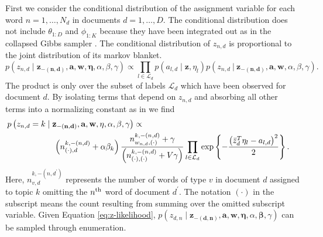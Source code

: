 First we consider the conditional distribution of the assignment variable
for each word $n=1,\ldots,N_{d}$ in documents $d=1,\ldots,D$. The
conditional distribution does not include $\theta_{1:D}$ and $\phi_{1:K}$
because they have been integrated out as in the collapsed Gibbs sampler
\citep{Griffiths04}. The conditional distribution of $z_{n,d}$ is
proportional to the joint distribution of its markov blanket. %
\begin{equation}
p\left(z_{n,d}\mid\mathbf{z_{-\left(n,d\right)}},\mathbf{a},\mathbf{w},\mathbf{\eta},\alpha,\beta,\gamma\right)\propto\prod_{l\in\mathcal{L}_{d}}p\left(a_{l,d}\mid\mathbf{z},\eta_{l}\right)p\left(z_{n,d}\ |\ \mathbf{z_{-\left(n,d\right)}},\mathbf{a},\mathbf{w},\alpha,\beta,\gamma\right).\end{equation}
 The product is only over the subset of labels $\mathcal{L}_{d}$
which have been observed for document $d$. By isolating terms that
depend on $z_{n,d}$ and absorbing all other terms into a normalizing
constant as in \citep{Griffiths04} we find \begin{eqnarray}
\lefteqn{p\left(z_{n,d}=k\mid\mathbf{z_{-\left(n,d\right)}},\mathbf{a},\mathbf{w},\mathbf{\eta},\alpha,\beta,\gamma\right)\propto}\nonumber \\
 & \hspace{2cm}\left(n_{\left(\cdot\right),d}^{k,-\left(n,d\right)}+\alpha\beta_{k}\right)\frac{n_{w_{n,d},\left(\cdot\right)}^{k,-\left(n,d\right)}+\gamma}{\left(n_{\left(\cdot\right),\left(\cdot\right)}^{k,-\left(n,d\right)}+V\gamma\right)}\prod_{l\in\mathcal{L}_{d}}\exp\left\{ -\frac{\left(\bar{z}_{d}^{T}\eta_{l}-a_{l,d}\right)^{2}}{2}\right\} .\label{eq:z-likelihood}\end{eqnarray}
 Here, $n_{v,d}^{k,-\left(n,d^{\prime}\right)}$ represents the number
of words of type $v$ in document $d$ assigned to topic $k$ omitting
the $n^{{\rm th}}$ word of document $d^{\prime}$. The notation $(\cdot)$
in the subscript means the count resulting from summing over the omitted
subscript variable. Given Equation \ref{eq:z-likelihood}, $p\left(z_{d,n}\mid\mathbf{z_{-\left(d,n\right)}},\mathbf{a},\mathbf{w},\mathbf{\eta},\alpha,\mathbf{\beta},\gamma\right)$
can be sampled through enumeration. 


